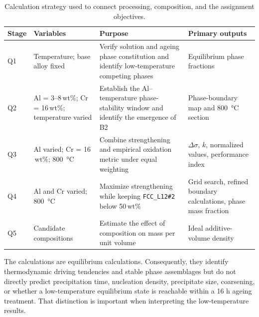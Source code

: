 \documentclass[11pt]{article}
\newcommand{\wtpct}{\ensuremath{\,\mathrm{wt}\%}}
\newcommand{\phase}[1]{\texttt{#1}}
\begin{document}
\begin{table}[H]
\centering
\caption{Calculation strategy used to connect processing, composition, and the assignment objectives.}
\label{tab:methodplan}
\small
\begin{tabularx}{\textwidth}{@{}p{}p{}X p{}@{}}
\toprule
\textbf{Stage} & \textbf{Variables} & \textbf{Purpose} & \textbf{Primary outputs} \\
\midrule
Q1 & Temperature; base alloy fixed & Verify solution and ageing phase constitution and identify low-temperature competing phases & Equilibrium phase fractions \\
Q2 & Al = 3--8\wtpct; Cr = 16\wtpct; temperature varied & Establish the Al--temperature phase-stability window and identify the emergence of B2 & Phase-boundary map and \SI{800}{\degreeCelsius} section \\
Q3 & Al varied; Cr = 16\wtpct; \SI{800}{\degreeCelsius} & Combine strengthening and empirical oxidation metric under equal weighting & $\Delta\sigma$, $k$, normalized values, performance index \\
Q4 & Al and Cr varied; \SI{800}{\degreeCelsius} & Maximize strengthening while keeping \phase{FCC\_L12\#2} below 50\wtpct{} & Grid search, refined boundary calculations, phase mass fraction \\
Q5 & Candidate compositions & Estimate the effect of composition on mass per unit volume & Ideal additive-volume density \\
\bottomrule
\end{tabularx}
\end{table}

The calculations are equilibrium calculations. Consequently, they identify thermodynamic driving tendencies and stable phase assemblages but do not directly predict precipitation time, nucleation density, precipitate size, coarsening, or whether a low-temperature equilibrium state is reachable within a 16 h ageing treatment. That distinction is important when interpreting the low-temperature results.
\end{document}
